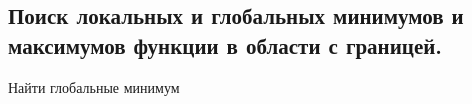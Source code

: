 \subsection{Поиск локальных и глобальных минимумов и максимумов функции в
области с границей.}
\begin{example}
  Найти глобальные минимум
\end{example}


